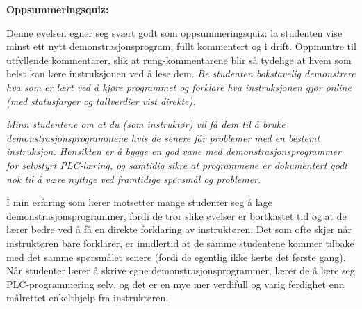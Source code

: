 \vfil \eject

\noindent
{\bf Oppsummeringsquiz:}

Denne øvelsen egner seg svært godt som oppsummeringsquiz: la studenten vise minst ett nytt demonstrasjonsprogram, fullt kommentert og i drift. Oppmuntre til utfyllende kommentarer, slik at rung-kommentarene blir så tydelige at hvem som helst kan lære instruksjonen ved å lese dem. {\it Be studenten bokstavelig demonstrere hva som er lært ved å kjøre programmet og forklare hva instruksjonen gjør online (med statusfarger og tallverdier vist direkte).}

\vskip 10pt

{\it Minn studentene om at du (som instruktør) vil få dem til å bruke demonstrasjonsprogrammene hvis de senere får problemer med en bestemt instruksjon. Hensikten er å bygge en god vane med demonstrasjonsprogrammer for selvstyrt PLC-læring, og samtidig sikre at programmene er dokumentert godt nok til å være nyttige ved framtidige spørsmål og problemer.}

\vskip 10pt

I min erfaring som lærer motsetter mange studenter seg å lage demonstrasjonsprogrammer, fordi de tror slike øvelser er bortkastet tid og at de lærer bedre ved å få en direkte forklaring av instruktøren. Det som ofte skjer når instruktøren bare forklarer, er imidlertid at de samme studentene kommer tilbake med det samme spørsmålet senere (fordi de egentlig ikke lærte det første gang). Når studenter lærer å skrive egne demonstrasjonsprogrammer, lærer de å lære seg PLC-programmering selv, og det er en mye mer verdifull og varig ferdighet enn målrettet enkelthjelp fra instruktøren.




